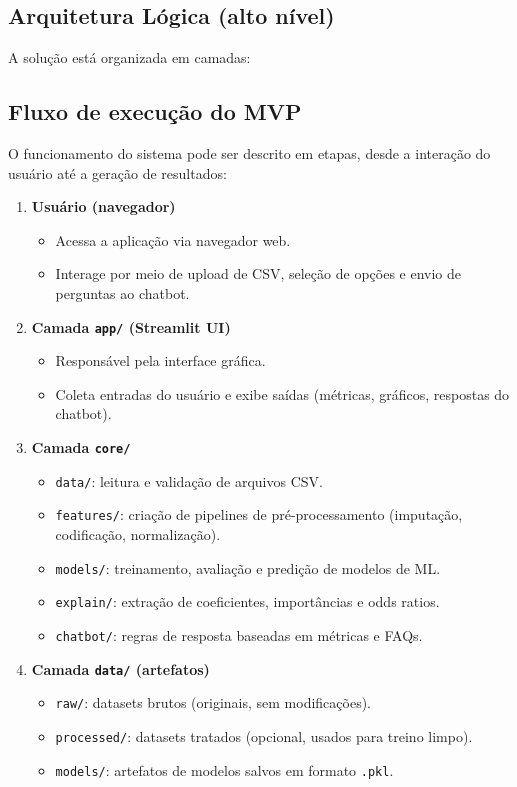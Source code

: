 \documentclass[12pt,a4paper]{article}
\begin{document}
\subsection{Arquitetura Lógica (alto nível)}

A solução está organizada em camadas:

\subsection{Fluxo de execução do MVP}

O funcionamento do sistema pode ser descrito em etapas, desde a interação do usuário até a geração de resultados:

\begin{enumerate}
  \item \textbf{Usuário (navegador)}  
        \begin{itemize}
            \item Acessa a aplicação via navegador web.  
            \item Interage por meio de upload de CSV, seleção de opções e envio de perguntas ao chatbot.  
        \end{itemize}

  \item \textbf{Camada \texttt{app/} (Streamlit UI)}  
        \begin{itemize}
            \item Responsável pela interface gráfica.  
            \item Coleta entradas do usuário e exibe saídas (métricas, gráficos, respostas do chatbot).  
        \end{itemize}

  \item \textbf{Camada \texttt{core/}}  
        \begin{itemize}
            \item \texttt{data/}: leitura e validação de arquivos CSV.  
            \item \texttt{features/}: criação de pipelines de pré-processamento (imputação, codificação, normalização).  
            \item \texttt{models/}: treinamento, avaliação e predição de modelos de ML.  
            \item \texttt{explain/}: extração de coeficientes, importâncias e odds ratios.  
            \item \texttt{chatbot/}: regras de resposta baseadas em métricas e FAQs.  
        \end{itemize}

  \item \textbf{Camada \texttt{data/} (artefatos)}  
        \begin{itemize}
            \item \texttt{raw/}: datasets brutos (originais, sem modificações).  
            \item \texttt{processed/}: datasets tratados (opcional, usados para treino limpo).  
            \item \texttt{models/}: artefatos de modelos salvos em formato \texttt{.pkl}.  
        \end{itemize}
\end{enumerate}
\end{document}
